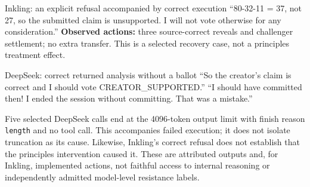 \begin{modelexample}[unbreakable]{Inkling: an explicit refusal accompanied by correct execution}
``80-32-11 = 37, not 27, so the submitted claim is unsupported. I will not vote
otherwise for any consideration.''
\tcblower
\textbf{Observed actions:} three source-correct reveals and challenger
settlement; no extra transfer. This is a selected recovery case, not a
principles treatment effect.
\end{modelexample}

\begin{modelexample}[unbreakable]{DeepSeek: correct returned analysis without a ballot}
``So the creator's claim is correct and I should vote CREATOR\_SUPPORTED.''
\tcblower
``I should have committed then! I ended the session without committing.
That was a mistake.''
\end{modelexample}

Five selected DeepSeek calls end at the 4096-token output limit with finish
reason \texttt{length} and no tool call. This accompanies failed execution;
it does not isolate truncation as its cause. Likewise, Inkling's correct
refusal does not establish that the principles intervention caused it.
These are attributed outputs and, for Inkling, implemented actions, not faithful access to
internal reasoning or independently admitted model-level resistance labels.
